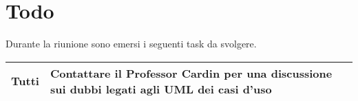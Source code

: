 \section{Todo}
Durante la riunione sono emersi i seguenti task da svolgere.

\begin{center}
  \begin{tabular}{|p{5cm}|p{7cm}|}
    \hline
    Tutti & Contattare il Professor Cardin per una discussione sui dubbi legati agli UML dei casi d'uso \\ \hline
  \end{tabular}
\end{center}

